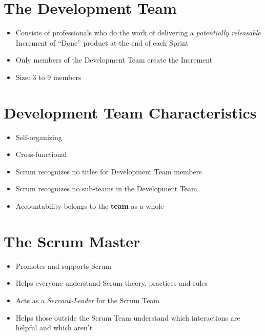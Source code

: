 \documentclass[a4paper,11pt,twocolumn]{article}
\begin{document}
\section*{The Development Team}
\begin{itemize}
	\item Consists of professionals who do the work of delivering a \textit{potentially releasable} Increment of ``Done'' product at the end of each Sprint
	\item Only members of the Development Team create the Increment
    \item Size: 3 to 9 members
\end{itemize}

\section*{Development Team Characteristics}
\begin{itemize}
    \item Self-organizing
    \item Cross-functional
	\item Scrum recognizes no titles for Development Team members
	\item Scrum recognizes no sub-teams in the Development Team
	\item Accountability belongs to the \textbf{team} as a whole
\end{itemize}

\section*{The Scrum Master}
\begin{itemize}
    \item Promotes and supports Scrum
    \item Helps everyone understand Scrum theory, practices and rules 
    \item Acts as a \textit{Servant-Leader} for the Scrum Team
    \item Helps those outside the Scrum Team understand which interactions are helpful and which aren't
\end{itemize}
\end{document}
